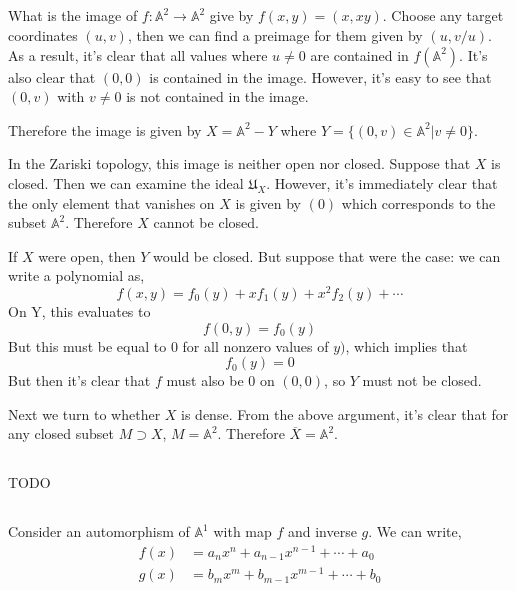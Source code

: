 \documentclass{article}
\begin{document}
\subsection{}
What is the image of \(f : \mathbb{A}^{2} \to \mathbb{A}^{2}\) give by \(f(x, y) = (x, xy)\). Choose any target coordinates \((u, v)\), then we can find a preimage for them given by \((u, v/u)\). As a result, it's clear that all values where \(u \neq 0\) are contained in \(f(\mathbb{A}^{2})\). It's also clear that \((0, 0)\) is contained in the image. However, it's easy to see that \((0, v)\) with \(v \neq 0\) is not contained in the image.

Therefore the image is given by \(X = \mathbb{A}^{2} - Y\) where \(Y = \{ (0, v) \in \mathbb{A}^{2} | v \neq 0\}\).

In the Zariski topology, this image is neither open nor closed. Suppose that \(X\) is closed. Then we can examine the ideal \(\mathfrak{U}_{X}\). However, it's immediately clear that the only element that vanishes on \(X\) is given by \((0)\) which corresponds to the subset \(\mathbb{A}^{2}\). Therefore \(X\) cannot be closed.

If \(X\) were open, then \(Y\) would be closed. But suppose that were the case: we can write a polynomial as,
\begin{equation}
f(x, y) = f_{0}(y) + xf_{1}(y) + x^{2}f_{2}(y) + \cdots
\end{equation}
On Y, this evaluates to
\begin{equation}
f(0, y) = f_{0}(y)
\end{equation}
But this must be equal to \(0\) for all nonzero values of \(y)\), which implies that
\begin{equation}
f_{0}(y) = 0
\end{equation}
But then it's clear that \(f\) must also be 0 on \((0, 0)\), so \(Y\) must not be closed.

Next we turn to whether \(X\) is dense. From the above argument, it's clear that for any closed subset \(M\supset X\), \(M = \mathbb{A}^{2}\). Therefore \(\overline{X} = \mathbb{A}^{2}\).

\subsection{}
TODO

\subsection{}
Consider an automorphism of \(\mathbb{A}^{1}\) with map \(f\) and inverse \(g\). We can write,
\begin{subequations}
\begin{align}
f(x) & = a_{n}x^{n} + a_{n-1}x^{n-1} + \cdots + a_{0} \\
g(x) & = b_{m}x^{m} + b_{m-1}x^{m-1} + \cdots + b_{0}
\end{align}
\end{subequations}
\end{document}
